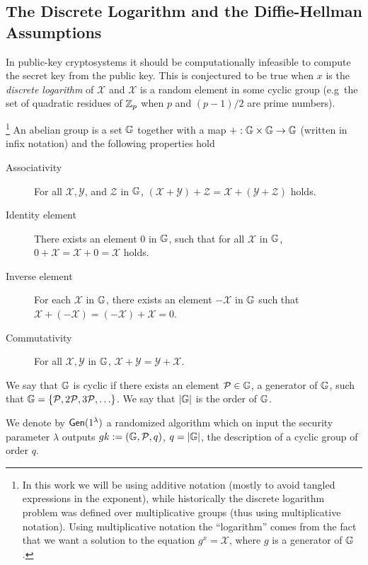 \subsection{The Discrete Logarithm and the Diffie-Hellman Assumptions}
In public-key cryptosystems it should be computationally infeasible to compute the secret key from the public key.
This is conjectured to be true when $x$ is the \emph{discrete logarithm} of $\mathcal{X}$ and $\mathcal{X}$ is a random element in some cyclic group (e.g~the set of quadratic residues of $\mathbb{Z}_p$ when $p$ and $(p-1)/2$ are prime numbers).
\begin{definition}\footnote{In this work we will be using additive notation (mostly to avoid tangled expressions in the exponent), while historically the discrete logarithm problem was defined over multiplicative groups (thus using multiplicative notation). Using multiplicative notation the ``logarithm'' comes from the fact that we want a solution to the equation $g^x=\mathcal{X}$, where $g$ is a generator of $\mathbb{G}$.} 
An abelian group is a set $\mathbb{G}$ together with a map $+:\mathbb{G}\times\mathbb{G}\to\mathbb{G}$ (written in infix notation) and  the following properties hold
\begin{description}
\item[Associativity]
For all $\mathcal{X}, \mathcal{Y}$, and $\mathcal{Z}$ in $\mathbb{G}$, $(\mathcal{X} + \mathcal{Y}) + \mathcal{Z}= \mathcal{X} + (\mathcal{Y} + \mathcal{Z})$ holds.
\item[Identity element]
There exists an element $0$ in $\mathbb{G}$, such that for all $\mathcal{X}$ in $\mathbb{G}$, $0 + \mathcal{X} = \mathcal{X} + 0 = \mathcal{X}$ holds.
\item[Inverse element]
For each $\mathcal{X}$ in $\mathbb{G}$, there exists an element $-\mathcal{X}$ in $\mathbb{G}$ such that $\mathcal{X}+ (-\mathcal{X}) = (-\mathcal{X}) +\mathcal{X} = 0$.
\item[Commutativity]
For all $\mathcal{X}, \mathcal{Y}$ in $\mathbb{G}$, $\mathcal{X} + \mathcal{Y}=\mathcal{Y}+\mathcal{X}$.
\end{description}
We say that $\mathbb{G}$ is cyclic if there exists an element $\mathcal{P}\in\mathbb{G}$, a generator of $\mathbb{G}$, such that $\mathbb{G}=\{\mathcal{P}, 2\mathcal{P}, 3\mathcal{P},\ldots\}$. We say that $|\mathbb{G}|$ is the order of $\mathbb{G}$.

We denote by $\mathsf{Gen}(1^\lambda)$ a randomized algorithm which on input the security parameter $\lambda$ outputs $gk:=(\mathbb{G},\mathcal{P},q)$, $q=|\mathbb{G}|$, the description of a cyclic group of order $q$.
\end{definition}

